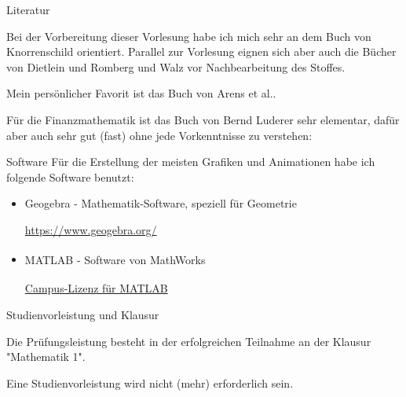 \begin{frame}{Literatur}
\footnotesize{Bei der Vorbereitung dieser Vorlesung habe ich mich sehr an dem Buch von Knorrenschild \cite{knorr-mathe} orientiert. Parallel zur Vorlesung eignen sich aber auch die Bücher von Dietlein und Romberg \cite{diet-panik} und Walz \cite{walz-mathe} vor Nachbearbeitung des Stoffes.

Mein persönlicher Favorit ist das Buch von Arens et al.\cite{arens-mathe}.

Für die Finanzmathematik ist das Buch von Bernd Luderer sehr elementar, dafür aber auch sehr gut (fast) ohne jede Vorkenntnisse zu verstehen: \cite{luderer-starthilfe}

\nocite{*}
\printbibliography
}
\end{frame}

\begin{frame}{Software}
	Für die Erstellung der meisten Grafiken und Animationen habe ich folgende Software benutzt:
	\begin{itemize}
		\item Geogebra - Mathematik-Software, speziell für Geometrie
		
		\href{https://www.geogebra.org/}{https://www.geogebra.org/}
		\item MATLAB\textsuperscript{\textregistered} - Software von MathWorks\textsuperscript{\textregistered}
		
		\href{http://www4.fh-swf.de/de/home/studierende/its/software/matlab__campuslizenz_/matlab_campuslizenz.php}{Campus-Lizenz für MATLAB\textsuperscript{\textregistered}}
	\end{itemize}
\end{frame}

\begin{frame}{Studienvorleistung und Klausur}

Die Prüfungsleistung besteht in der erfolgreichen Teilnahme an der Klausur "Mathematik 1".

Eine Studienvorleistung wird nicht (mehr) erforderlich sein.


\end{frame}